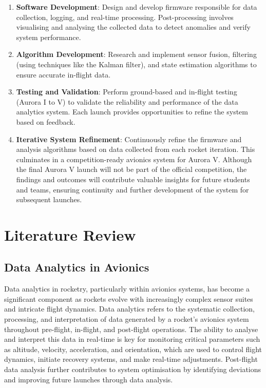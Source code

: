 \begin{enumerate}
    \item \textbf{Software Development}: Design and develop firmware responsible for data collection, logging, and real-time processing. Post-processing involves visualising and analysing the collected data to detect anomalies and verify system performance.
    \item \textbf{Algorithm Development}: Research and implement sensor fusion, filtering (using techniques like the Kalman filter), and state estimation algorithms to ensure accurate in-flight data.
    \item \textbf{Testing and Validation}: Perform ground-based and in-flight testing (Aurora I to V) to validate the reliability and performance of the data analytics system. Each launch provides opportunities to refine the system based on feedback.
    \item \textbf{Iterative System Refinement}: Continuously refine the firmware and analysis algorithms based on data collected from each rocket iteration. This culminates in a competition-ready avionics system for Aurora V. Although the final Aurora V launch will not be part of the official competition, the findings and outcomes will contribute valuable insights for future students and teams, ensuring continuity and further development of the system for subsequent launches.
\end{enumerate}


\section{Literature Review}
\subsection{Data Analytics in Avionics}
Data analytics in rocketry, particularly within avionics systems, has become a significant component as rockets evolve with increasingly complex sensor suites and intricate flight dynamics. Data analytics refers to the systematic collection, processing, and interpretation of data generated by a rocket's avionics system throughout pre-flight, in-flight, and post-flight operations. The ability to analyse and interpret this data in real-time is key for monitoring critical parameters such as altitude, velocity, acceleration, and orientation, which are used to control flight dynamics, initiate recovery systems, and make real-time adjustments. Post-flight data analysis further contributes to system optimisation by identifying deviations and improving future launches through data analysis. 

